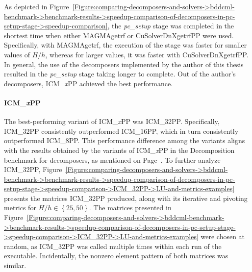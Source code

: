 As depicted in Figure~\ref{Figure:comparing-decomposers-and-solvers->bddcml-benchmark->benchmark-results->speedup-comparison-of-decomposers-in-pc-setup-stage->speedup-comparison}, the \textit{pc\_setup} stage was completed in the shortest time when either MAGMAgetrf or CuSolverDnXgetrfPP were used.
Specifically, with MAGMAgetrf, the execution of the stage was faster for smaller values of $H/h$, whereas for larger values, it was faster with CuSolverDnXgetrfPP.
In general, the use of the decomposers implemented by the author of this thesis resulted in the \textit{pc\_setup} stage taking longer to complete.
Out of the author's decomposers, ICM\_\textit{x}PP achieved the best performance.

\paragraph{ICM\_\textit{x}PP} The best-performing variant of ICM\_\textit{x}PP was ICM\_32PP.
Specifically, ICM\_32PP consistently outperformed ICM\_16PP, which in turn consistently outperformed ICM\_8PP.
This performance difference among the variants aligns with the results obtained by the variants of ICM\_\textit{x}PP in the Decomposition benchmark for decomposers, as mentioned on Page~\pageref{Text:comparing-decomposers-and-solvers->decomposition-project-benchmarks->decomposers-benchmark->comparison-of-execution-times-on-subset-of-matrices->ICMxPP->performance-of-variants}.
To further analyze ICM\_32PP, Figure~\ref{Figure:comparing-decomposers-and-solvers->bddcml-benchmark->benchmark-results->speedup-comparison-of-decomposers-in-pc-setup-stage->speedup-comparison->ICM_32PP->LU-and-metrics-examples} presents the  matrices ICM\_32PP produced, along with its iterative and pivoting metrics for $H/h \in \left\{25, 50\right\}$.
The matrices presented in Figure~\ref{Figure:comparing-decomposers-and-solvers->bddcml-benchmark->benchmark-results->speedup-comparison-of-decomposers-in-pc-setup-stage->speedup-comparison->ICM_32PP->LU-and-metrics-examples} were chosen at random, as ICM\_32PP was called multiple times within each run of the  executable.
Incidentally, the nonzero element pattern of both matrices was similar.

